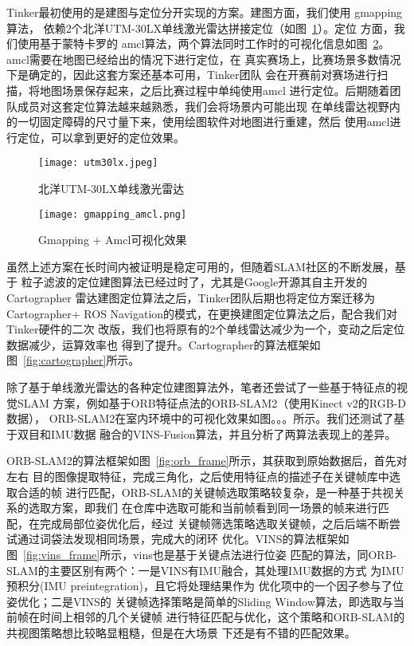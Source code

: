 Tinker最初使用的是建图与定位分开实现的方案。建图方面，我们使用
gmapping算法\cite{grisettiyz2005improving}，
依赖2个北洋UTM-30LX单线激光雷达拼接定位（如图~\ref{fig:utm30lx}）。定位
方面，我们使用基于蒙特卡罗的
amcl算法\cite{fox2002kld}，两个算法同时工作时的可视化信息如图~\ref{fig:gmapping_amcl}。
amcl需要在地图已经给出的情况下进行定位，在
真实赛场上，比赛场景多数情况下是确定的，因此这套方案还基本可用，Tinker团队
会在开赛前对赛场进行扫描，将地图场景保存起来，之后比赛过程中单纯使用amcl
进行定位。后期随着团队成员对这套定位算法越来越熟悉，我们会将场景内可能出现
在单线雷达视野内的一切固定障碍的尺寸量下来，使用绘图软件对地图进行重建，然后
使用amcl进行定位，可以拿到更好的定位效果。

\begin{figure}
  \centering
  \texttt{[image: utm30lx.jpeg]}
  \caption{北洋UTM-30LX单线激光雷达}
  \label{fig:utm30lx}
\end{figure}


\begin{figure}
  \centering
  \texttt{[image: gmapping\_amcl.png]}
  \caption{Gmapping + Amcl可视化效果}
  \label{fig:gmapping_amcl}
\end{figure}

虽然上述方案在长时间内被证明是稳定可用的，但随着SLAM社区的不断发展，基于
粒子滤波的定位建图算法已经过时了，尤其是Google开源其自主开发的Cartographer
雷达建图定位算法\cite{hess2016real}之后，Tinker团队后期也将定位方案迁移为Cartographer+
ROS Navigation的模式，在更换建图定位算法之后，配合我们对Tinker硬件的二次
改版，我们也将原有的2个单线雷达减少为一个，变动之后定位数据减少，运算效率也
得到了提升。Cartographer的算法框架如图~\ref{fig:cartographer}所示。


除了基于单线激光雷达的各种定位建图算法外，笔者还尝试了一些基于特征点的视觉SLAM
方案，例如基于ORB特征点法的ORB-SLAM2（使用Kinect v2的RGB-D数据）\cite{mur2015orb}，
ORB-SLAM2在室内环境中的可视化效果如图。。。所示。我们还测试了基于双目和IMU数据
融合的VINS-Fusion\cite{qin2018vins}算法，并且分析了两算法表现上的差异。

ORB-SLAM2的算法框架如图~\ref{fig:orb_frame}所示，其获取到原始数据后，首先对左右
目的图像提取特征，完成三角化，之后使用特征点的描述子在关键帧库中选取合适的帧
进行匹配，ORB-SLAM的关键帧选取策略较复杂，是一种基于共视关系的选取方案，即我们
在仓库中选取可能和当前帧看到同一场景的帧来进行匹配，在完成局部位姿优化后，经过
关键帧筛选策略选取关键帧，之后后端不断尝试通过词袋法发现相同场景，完成大的闭环
优化。VINS的算法框架如图~\ref{fig:vins_frame}所示，vins也是基于关键点法进行位姿
匹配的算法，同ORB-SLAM的主要区别有两个：一是VINS有IMU融合，其处理IMU数据的方式
为IMU预积分(IMU preintegration)\cite{forster2015manifold}，且它将处理结果作为
优化项中的一个因子参与了位姿优化；二是VINS的
关键帧选择策略是简单的Sliding Window算法，即选取与当前帧在时间上相邻的几个关键帧
进行特征匹配与优化，这个策略和ORB-SLAM的共视图策略想比较略显粗糙，但是在大场景
下还是有不错的匹配效果。




